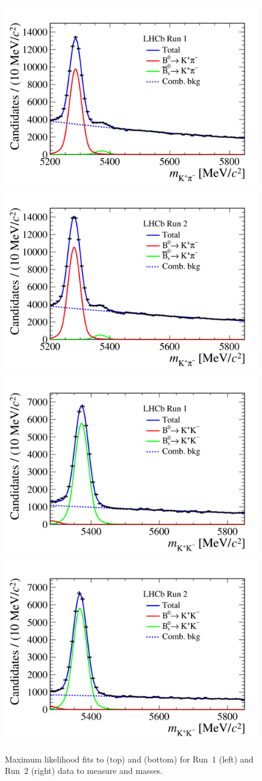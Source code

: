 \begin{figure}[tbp]
    \centering
     \includegraphics[width= 0.49 \textwidth]{./Figs/BFAnalysis/hidef_Fig9top.png}
     \includegraphics[width= 0.49 \textwidth]{./Figs/BFAnalysis/hidef_Fig9bot.png}
     \includegraphics[width= 0.49 \textwidth]{./Figs/BFAnalysis/hidef_Fig10top.png}
     \includegraphics[width= 0.49 \textwidth]{./Figs/BFAnalysis/hidef_Fig10bot.png}
     \caption{Maximum likelihood fits to \bdkpi (top) and \bskk (bottom) for Run~1 (left) and Run~2 (right) data to measure \bd and \bs masses.}
     \label{fig:means}
\end{figure}

